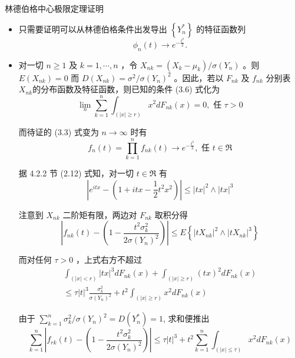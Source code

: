 \begin{frame}{林德伯格中心极限定理证明}
\begin{itemize}
	\item 只需要证明可以从林德伯格条件出发导出 $\left\{Y_n^*\right\}$ 的特征函数列 \[\phi_{n}(t)\rightarrow e^{-\frac{t^2}{2}}.\]
    \item
	对一切 $n \geq 1$ 及 $k=1, \cdots, n$ ，令 $X_{nk}=\left(X_{k}-\mu_k\right) / \sigma(Y_n)$ 。则 $E\left(X_{nk}\right)=0$ 而 $D\left(X_{nk}\right)=\sigma^{2} / \sigma(Y_n)^{2}$ 。因此，若以 $F_{n k}$ 及 $f_{n k}$ 分别表 $X_{nk}$的分布函数及特征函数，则已知的条件 (3.6) 式化为
	\[
	\lim _{n} \sum_{k=1}^{n} \int_{(|x| \geq r)} x^{2} d F_{n k}(x)=0,  \text { 任 } \tau>0
	\]

	而待证的 (3.3) 式变为 $n \rightarrow \infty$ 时有
	\[
	f_{n}(t)=\prod_{k=1}^{n} f_{n k}(t) \longrightarrow e^{-\frac{t^{2}}{2}},  \text { 任 } t \in \Re
	\]

	据 4.2.2 节 (2.12) 式知，对一切 $t \in \Re$ 有
	\[
	\left|e^{i t x}-\left(1+i t x-\frac{1}{2} t^{2} x^{2}\right)\right| \leq|t x|^{2} \wedge|t x|^{3}
	\]

	注意到 $X_{nk}$ 二阶矩有限，两边对 $F_{n k}$ 取积分得
	\[
	\left|f_{n k}(t)-\left(1-\frac{t^{2} \sigma_{k}^{2}}{2 \sigma(Y_n)^{2}}\right)\right| \leq E\left\{\left|t X_{nk}\right|^{2} \wedge\left|t X_{nk}\right|^{3}\right\}
	\]

	而对任何 $\tau>0$ ，上式右方不超过
	\[
	\begin{array}{c}
	\int_{(|x|<r)}|t x|^{3} d F_{n k}(x)+\int_{(|x| \geq r)}(t x)^{2} d F_{n k}(x) \\
	 \leq \tau|t|^{3} \frac{\sigma_{k}^{2}}{\sigma(Y_n)^{2}}+t^{2} \int_{(|x| \geq r)} x^{2} d F_{n k}(x)
	\end{array}
	\]

	由于 $\sum_{k=1}^{n} \sigma_{k}^{2} / \sigma(Y_n)^{2}=D\left(Y_n^*\right)=1$, 求和便推出
	\[
	\sum_{k=1}^{n}\left|f_{r k}(t)-\left(1-\frac{t^{2} \sigma_{k}^{2}}{2 \sigma(Y_n)^{2}}\right)\right| \leq \tau|t|^{3}+t^{2} \sum_{k=1}^{n} \int_{(|x| \leq \tau)} x^{2} d F_{n k}(x)
	\]
\end{itemize}

\end{frame}

